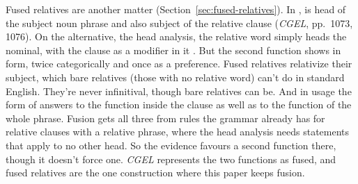Fused relatives are another matter (Section~\ref{sec:fused-relatives}). In ,  is head of the subject noun phrase and also subject of the relative clause (\textit{CGEL}, pp.~1073, 1076). On the alternative, the head analysis, the relative word simply heads the nominal, with the clause as a modifier in it \citep{bresnan1978free}. But the second function shows in form, twice categorically and once as a preference. Fused relatives relativize their subject, which bare relatives (those with no relative word) can't do in standard English. They're never infinitival, though bare relatives can be. And in usage the form of  answers to the function inside the clause as well as to the function of the whole phrase. Fusion gets all three from rules the grammar already has for relative clauses with a relative phrase, where the head analysis needs statements that apply to no other head. So the evidence favours a second function there, though it doesn't force one. \textit{CGEL} represents the two functions as fused, and fused relatives are the one construction where this paper keeps fusion.
